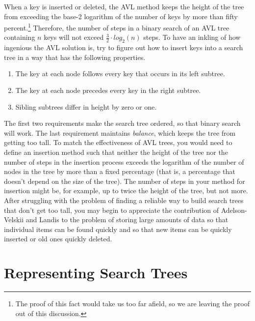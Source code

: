 When a key is inserted or deleted,
the AVL method keeps the height of the tree from exceeding
the base-2 logarithm of the number of keys by more than
\label{50pct-thm}
fifty percent.\footnote{The proof
of this fact would take us too far afield, so we are
leaving the proof out of this discussion.}
Therefore, the number of steps in a binary search
of an AVL tree containing $n$ keys
will  not exceed $\frac{3}{2}\cdot log_2(n)$ steps.
To have an inkling of how ingenious the AVL solution is,
try to figure out how to insert keys into a search tree
in a way that has the following properties.
\begin{enumerate}
\item The key at each node follows every key that occurs in its left subtree.
\item The key at each node precedes every key in the right subtree.
\item Sibling subtrees differ in height by zero or one.
\end{enumerate}

The first two requirements make the search tree ordered,
so that binary search will work.
The last requirement maintains
\label{balance-def}
\emph{balance},
which keeps the tree from getting too tall.
To match the effectiveness of AVL trees,
you would need to define an insertion method
such that neither the height of the tree nor
the number of steps in the insertion
process exceeds the logarithm of the
number of nodes in the tree by more
than a fixed percentage (that is, a percentage that
doesn't depend on the size of the tree).
The number of steps in your method for insertion
might be, for example, up to twice the height of the tree,
but not more.
After struggling with the problem of
finding a reliable way to build search trees
that don't get too tall,
you may begin to appreciate the contribution
of Adelson-Velskii and Landis to the problem
of storing large amounts of data so that
individual items can be found quickly
and so that new items can be quickly inserted or
old ones quickly deleted.

\section{Representing Search Trees}

